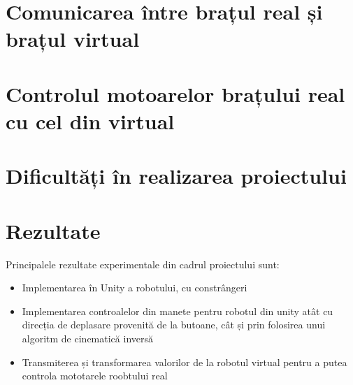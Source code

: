 \section {Comunicarea între brațul real și brațul virtual}
\section {Controlul motoarelor brațului real cu cel din virtual}
\section {Dificultăți în realizarea proiectului}
\section {Rezultate}
Principalele rezultate experimentale din cadrul proiectului sunt:
\begin{itemize}
	\item Implementarea în Unity a robotului, cu constrângeri
	\item Implementarea controalelor din manete pentru robotul din unity atât cu direcția de deplasare provenită de la butoane, cât și prin folosirea unui algoritm de cinematică inversă
	\item Transmiterea și transformarea valorilor de la robotul virtual pentru a putea controla mototarele roobtului real
	\
	\end{itemize}

